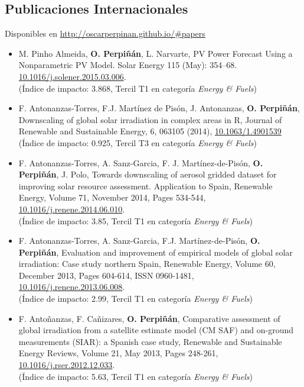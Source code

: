 \documentclass[article, a4paper]{memoir}
\begin{document}
\subsection{Publicaciones Internacionales}
\label{sec-7-1}
Disponibles en \url{http://oscarperpinan.github.io/#papers}

\begin{itemize}
\item M. Pinho Almeida, \textbf{O. Perpiñán}, L. Narvarte, PV Power Forecast Using a Nonparametric PV Model. Solar Energy 115 (May): 354–68. \url{10.1016/j.solener.2015.03.006}.\\ (Índice de impacto: 3.868, Tercil T1 en categoría \emph{Energy \& Fuels})

\item F. Antonanzas-Torres, F.J. Martínez de Pisón, J. Antonanzas, \textbf{O. Perpiñán}, Downscaling of global solar irradiation in complex areas in R, Journal of Renewable and Sustainable Energy, 6, 063105 (2014), \href{http://dx.doi.org/10.1063/1.4901539}{10.1063/1.4901539} \\ (Índice de impacto: 0.925, Tercil T3 en categoría \emph{Energy \& Fuels})

\item F. Antonanzas-Torres, A. Sanz-Garcia, F. J. Martínez-de-Pisón, \textbf{O. Perpiñán}, J. Polo, Towards downscaling of aerosol gridded dataset for improving solar resource assessment. Application to Spain, Renewable Energy, Volume 71, November 2014, Pages 534-544, \href{http://dx.doi.org/10.1016/j.renene.2014.06.010}{10.1016/j.renene.2014.06.010}. \\ (Índice de impacto: 3.85, Tercil T1 en categoría \emph{Energy \& Fuels})

\item F. Antonanzas-Torres, A. Sanz-Garcia, F.J. Martínez-de-Pisón, \textbf{O. Perpiñán}, Evaluation and improvement of empirical models of global solar irradiation: Case study northern Spain, Renewable Energy, Volume 60, December 2013, Pages 604-614, ISSN 0960-1481, \href{http://dx.doi.org/10.1016/j.renene.2013.06.008}{10.1016/j.renene.2013.06.008}. \\ (Índice de impacto: 2.99, Tercil T1 en categoría \emph{Energy \& Fuels})

\item F. Antoñanzas, F. Cañizares, \textbf{O. Perpiñán}, Comparative assessment of global irradiation from a satellite estimate model (CM SAF) and on-ground measurements (SIAR): a Spanish case study, Renewable and Sustainable Energy Reviews, Volume 21, May 2013, Pages 248-261, \href{http://dx.doi.org/10.1016/j.rser.2012.12.033}{10.1016/j.rser.2012.12.033}. \\ (Índice de impacto: 5.63, Tercil T1 en categoría \emph{Energy \& Fuels})


\end{itemize}
\end{document}
